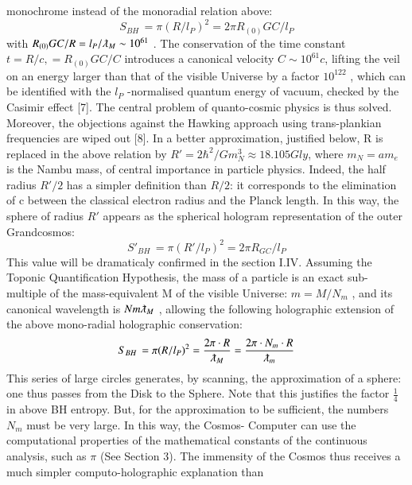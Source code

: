 \documentclass[twoside,draft]{article}
\begin{document}
{monochrome instead of the monoradial relation above:
\begin{equation}
S_{BH}\, = \pi(R/l_P )^{2} = 2\pi R_{(0)} GC /l_{P}
\end{equation}
with $R_{(0)} GC /R = l_{P} /\lambdabar_{M} \sim 10^{61}$ . The conservation of the time constant $t = R/c, = R_{(0)} GC /C$ introduces a canonical velocity $C \sim 10^{61} c$, lifting the veil on an energy larger than that of the visible Universe by a
factor $10^{122}$ , which can be identified with the $l_{P}$ -normalised quantum energy of vacuum, checked by
the Casimir effect [7]. The central problem of quanto-cosmic physics is thus solved. Moreover, the
objections against the Hawking approach using trans-plankian frequencies are wiped out [8].
In a better approximation, justified below, R is replaced in the above relation by $R\prime = 2\hbar^{2}/Gm_{N}^{3}
\approx 18.105 Gly$, where $m_{N} = am_{e}$ is the Nambu mass, of central importance in particle
physics. Indeed, the half radius $R\prime/2$ has a simpler definition than $R/2$: it corresponds to the
elimination of c between the classical electron radius and the Planck length. In this way, the sphere
of radius $R\prime$ appears as the spherical hologram representation of the outer Grandcosmos:
\begin{equation}
S\prime_{BH}\, = \pi(R\prime/l_{P})^{2} = 2\pi R_{GC} /l_{P}
\end{equation}
This value will be dramaticaly confirmed in the section I.IV.
Assuming the Toponic Quantification Hypothesis, the mass of a particle is an exact sub-multiple
of the mass-equivalent M of the visible Universe: $m = M/N_{m}$ , and its canonical wavelength is $N m \lambdabar_{M}$ ,
allowing the following holographic extension of the above mono-radial holographic conservation:
\begin{equation}
S_{BH}\, = \pi(R/l_{P})^{2} = \frac{2\pi \cdot R}{\lambdabar_{M}} = \frac{2\pi \cdot N_{m} \cdot R}{\lambdabar_{m}}
\end{equation}
This series of large circles generates, by scanning, the approximation of a sphere: one thus passes
from the Disk to the Sphere. Note that this justifies the factor $\frac{1}{4}$ in above BH entropy. But, for
the approximation to be sufficient, the numbers $N_{m}$ must be very large. In this way, the Cosmos-
Computer can use the computational properties of the mathematical constants of the continuous
analysis, such as $\pi$ (See Section 3).
The immensity of the Cosmos thus receives a much simpler computo-holographic explanation than
}
\end{document}
